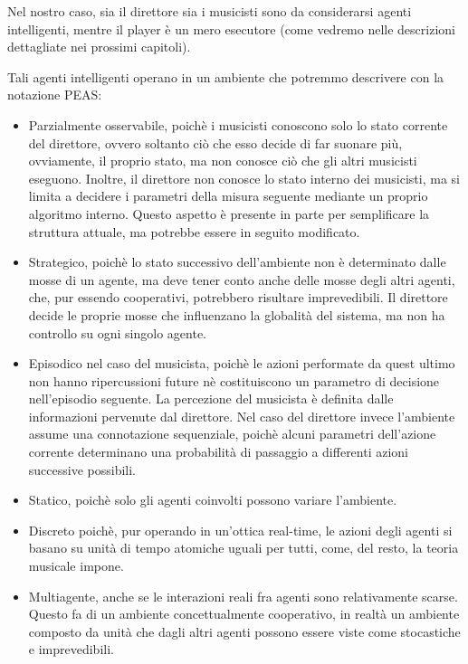 Nel nostro caso, sia il direttore sia i musicisti sono da considerarsi agenti intelligenti, mentre il player è un mero esecutore (come vedremo nelle descrizioni dettagliate nei prossimi capitoli).

Tali agenti intelligenti operano in un ambiente che potremmo descrivere con la notazione PEAS:
\begin{itemize}
 \item Parzialmente osservabile, poichè i musicisti conoscono solo lo stato corrente del direttore, ovvero soltanto ciò che esso decide di far suonare più, ovviamente, il proprio stato, ma non conosce ciò che gli altri musicisti eseguono.
 Inoltre, il direttore non conosce lo stato interno dei musicisti, ma si limita a decidere i parametri della misura seguente mediante un proprio algoritmo interno.
 Questo aspetto è presente in parte per semplificare la struttura attuale, ma potrebbe essere in seguito modificato.
 \item Strategico, poichè lo stato successivo dell'ambiente non è determinato dalle mosse di un agente, ma deve tener conto anche delle mosse degli altri agenti, che, pur essendo cooperativi, potrebbero risultare imprevedibili.
 Il direttore decide le proprie mosse che influenzano la globalità del sistema, ma non ha controllo su ogni singolo agente.
 \item Episodico nel caso del musicista, poichè le azioni performate da quest ultimo non hanno ripercussioni future nè costituiscono un parametro di decisione nell'episodio seguente.
 La percezione del musicista è definita dalle informazioni pervenute dal direttore.
 Nel caso del direttore invece l'ambiente assume una connotazione sequenziale, poichè alcuni parametri dell'azione corrente determinano una probabilità di passaggio a differenti azioni successive possibili.
 \item Statico, poichè solo gli agenti coinvolti possono variare l'ambiente.
 \item Discreto poichè, pur operando in un'ottica real-time, le azioni degli agenti si basano su unità di tempo atomiche uguali per tutti, come, del resto, la teoria musicale impone.
 \item Multiagente, anche se le interazioni reali fra agenti sono relativamente scarse. Questo fa di un ambiente concettualmente cooperativo, in realtà un ambiente composto da unità che dagli altri agenti possono essere viste come stocastiche e imprevedibili.
 \end{itemize}


